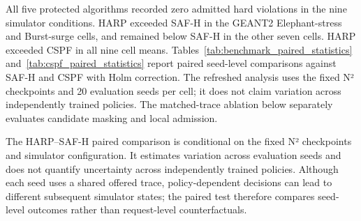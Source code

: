 \documentclass[final,5p]{elsarticle}
\newcommand{\rev}[1]{\textcolor{revisiongreen}{#1}}
\let\newrev\rev
\begin{document}
\newrev{All five protected algorithms recorded zero admitted hard violations in the nine simulator conditions. HARP exceeded SAF-H in the GEANT2 Elephant-stress and Burst-surge cells, and remained below SAF-H in the other seven cells. HARP exceeded CSPF in all nine cell means. Tables~\ref{tab:benchmark_paired_statistics} and~\ref{tab:cspf_paired_statistics} report paired seed-level comparisons against SAF-H and CSPF with Holm correction. The refreshed analysis uses the fixed N² checkpoints and 20 evaluation seeds per cell; it does not claim variation across independently trained policies. The matched-trace ablation below separately evaluates candidate masking and local admission.}

\begin{table}[t]
\color{revisiongreen}
\centering
\caption{\newrev{HARP--SAF-H acceptance differences ($\Delta$, percentage points; 20 paired seeds). Intervals: bootstrap 95\% CI; $p_H$: Wilcoxon $p$ with Holm correction across nine conditions; $r$: rank-biserial effect. Profiles E/B/C follow Table~\ref{tab:simulation_acceptance_summary}.}}
\label{tab:benchmark_paired_statistics}
\scriptsize
\setlength{\tabcolsep}{3pt}
\end{table}

\newrev{The HARP--SAF-H paired comparison is conditional on the fixed N² checkpoints and simulator configuration. It estimates variation across evaluation seeds and does not quantify uncertainty across independently trained policies. Although each seed uses a shared offered trace, policy-dependent decisions can lead to different subsequent simulator states; the paired test therefore compares seed-level outcomes rather than request-level counterfactuals.}
\end{document}
